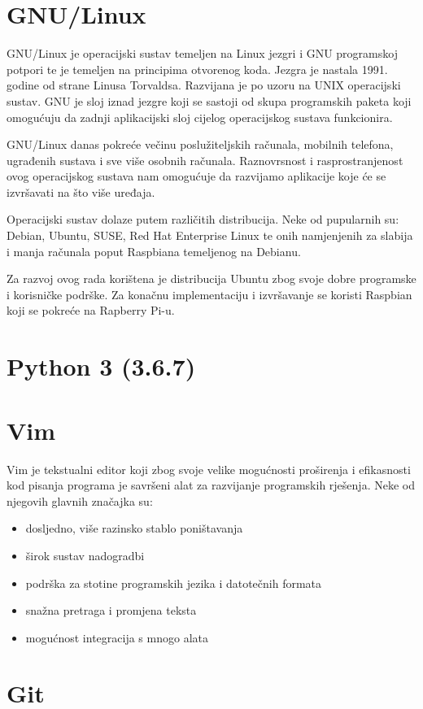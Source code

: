 \documentclass[times, utf8, zavrsni]{fer}
\begin{document}
\section{GNU/Linux}	
GNU/Linux je operacijski sustav temeljen na Linux jezgri i GNU programskoj potpori te je temeljen na principima otvorenog koda. Jezgra je nastala 1991. godine od strane Linusa Torvaldsa. Razvijana je po uzoru na UNIX operacijski sustav. GNU je sloj iznad jezgre koji se sastoji od skupa programskih paketa koji omogućuju da zadnji aplikacijski sloj cijelog operacijskog sustava funkcionira. \par 
GNU/Linux danas pokreće večinu poslužiteljskih računala, mobilnih telefona, ugrađenih sustava i sve više osobnih računala. Raznovrsnost i rasprostranjenost ovog operacijskog sustava nam omogućuje da razvijamo aplikacije koje će se izvršavati na što više uređaja.\par
Operacijski sustav dolaze putem različitih distribucija. Neke od pupularnih su: Debian, Ubuntu, SUSE, Red Hat Enterprise Linux te onih namjenjenih za slabija i manja računala poput Raspbiana temeljenog na Debianu.\par 
Za razvoj ovog rada korištena je distribucija Ubuntu zbog svoje dobre programske i korisničke podrške. Za konačnu implementaciju i izvršavanje se koristi Raspbian koji se pokreće na Rapberry Pi-u.
\section{Python 3 (3.6.7)}

\section{Vim}
Vim je tekstualni editor koji zbog svoje velike mogućnosti proširenja i efikasnosti kod pisanja programa je savršeni alat za razvijanje programskih rješenja. Neke od njegovih glavnih značajka su:
\begin{itemize}
\item dosljedno, više razinsko stablo poništavanja
\item širok sustav nadogradbi
\item podrška za stotine programskih jezika i datotečnih formata
\item snažna pretraga i promjena teksta
\item mogućnost integracija s mnogo alata
\end{itemize}
\section{Git}
\end{document}
